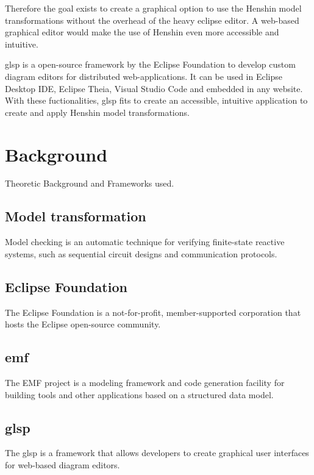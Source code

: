 \documentclass[conference,onecolumn]{IEEEtran}
\begin{document}
  Therefore the goal exists to create a graphical option to use the Henshin model transformations without the overhead of the heavy eclipse editor. A web-based graphical editor would make the use of Henshin even more accessible and intuitive.

  \ac{glsp} is a open-source framework by the Eclipse Foundation to develop custom diagram editors for distributed web-applications. \cite{glsp-repo} It can be used in Eclipse Desktop IDE, Eclipse Theia, Visual Studio Code and embedded in any website. With these fuctionalities, \ac{glsp} fits to create an accessible, intuitive application to create and apply Henshin model transformations.

  \section{Background}
  \label{sec:background}
  Theoretic Background and Frameworks used.

  \subsection{Model transformation}
  \label{subsec:model-checking}
  Model checking is an automatic technique for verifying finite-state reactive systems, such as sequential circuit designs and communication protocols.
  \cite{modelchecking1} \cite{modelchecking2}

  \subsection{Eclipse Foundation}
  \label{subsec:eclipse-foundation}
  The Eclipse Foundation is a not-for-profit, member-supported corporation that hosts the Eclipse open-source community.

  \subsection{\ac{emf}}
  \label{subsec:emf}

  The EMF project is a modeling framework and code generation facility for building tools and other applications based on a structured data model.
  \cite{emf} \cite{emf-repo}

  \subsection{\ac{glsp}}
  \label{subsec:glsp}

  The \ac{glsp} is a framework that allows developers to create graphical user interfaces for web-based diagram editors.
  \cite{glsp-repo}
\end{document}
